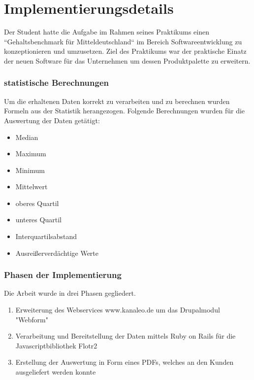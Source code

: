 \part{Implementierungsdetails}
Der Student hatte die Aufgabe im Rahmen seines Praktikums einen
``Gehaltsbenchmark für Mitteldeutschland`` im Bereich  Softwareentwicklung zu
konzeptionieren und umzusetzen. Ziel des Praktikums war der praktische Einatz
der neuen Software für das Unternehmen um dessen Produktpalette zu erweitern.
\section{statistische Berechnungen}
Um die erhaltenen Daten korrekt zu verarbeiten und zu berechnen wurden Formeln
aus der Statistik herangezogen. Folgende Berechnungen wurden für die Auswertung
der Daten getätigt:
\begin{itemize}
  \item Median 
  \item Maximum
  \item Minimum
  \item Mittelwert
  \item oberes Quartil
  \item unteres Quartil
  \item Interquartilsabstand
  \item Ausreißerverdächtige Werte
\end{itemize}
\section{Phasen der Implementierung}
Die Arbeit wurde in drei Phasen gegliedert. 
\begin{enumerate}
  \item Erweiterung des Webservices www.kanaleo.de um das Drupalmodul "Webform"
  \item Verarbeitung und Bereitstellung der Daten mittels Ruby on Rails für die
Javascriptbibliothek Flotr2 
  \item Erstellung der Auswertung in Form eines PDFs, welches an den Kunden
ausgeliefert werden konnte
\end{enumerate}
